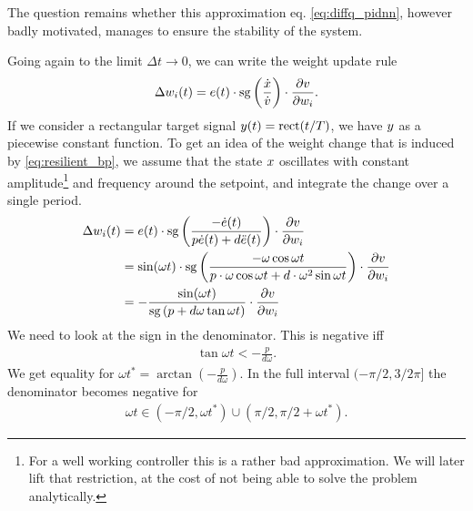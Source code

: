 \documentclass{article}
\begin{document}
    The question remains whether this approximation eq. \eqref{eq:diffq_pidnn}, however badly motivated, manages to ensure
    the stability of the system.

    Going again to the limit $\Delta t \rightarrow 0$, we can write the weight update rule 
    \begin{align}
         \Delta w_i(t) = e(t) \cdot \operatorname{sg} \left(\frac{\dot{x}}{\dot{v}} \right) \cdot \frac{\partial v}{\partial w_i}.
         \label{eq:resilient_bp}
    \end{align}
    If we consider a rectangular target signal $y(t) = \mathrm{rect}(t/T)$, we have $y$ as a piecewise constant function. 
    To get an idea of the weight change that is induced by \eqref{eq:resilient_bp}, we assume that the state $x$ oscillates with constant amplitude\footnote{For a well working controller this is a rather bad approximation. We will later lift that restriction, at the cost of not being able to solve the problem analytically.} and frequency around the setpoint, and integrate the change over a single period.
    \begin{align}
         \Delta w_i(t) &= e(t) \cdot \operatorname{sg} \left( \frac{-\dot{e}(t)}{p \dot{e}(t) + d \ddot{e}(t)} \right)  \cdot \frac{\partial v}{\partial w_i} \label{eq:general_res_bp_wc}\\
         &= \sin(\omega t) \cdot  \mathrm{sg} \left(\frac{-\omega \cos{\omega t}}{p \cdot \omega \cos{\omega t} + d \cdot \omega^2 \sin{\omega t} } \right) \cdot \frac{\partial v}{\partial w_i} \nonumber \\
         &=-\frac{ \sin(\omega t) }{\mathrm{sg}\left(p + d \omega \tan{\omega t}\right) } \cdot \frac{\partial v}{\partial w_i}
    \end{align}
    We need to look at the sign in the denominator. This is negative iff
    \begin{align}
        \tan{\omega t} < -\frac{p}{d \omega}. \label{eq:sign_condition}
    \end{align}
    We get equality for $\omega t^* = \arctan \left(-\frac{p}{d \omega} \right)$. In the full interval $(-\pi/2, 3/2\pi]$ the denominator becomes negative for 
    \begin{align}
        \omega t \in (-\pi/2, \omega t^*) \cup (\pi/2, \pi/2+\omega t^*).
    \end{align}
\end{document}

